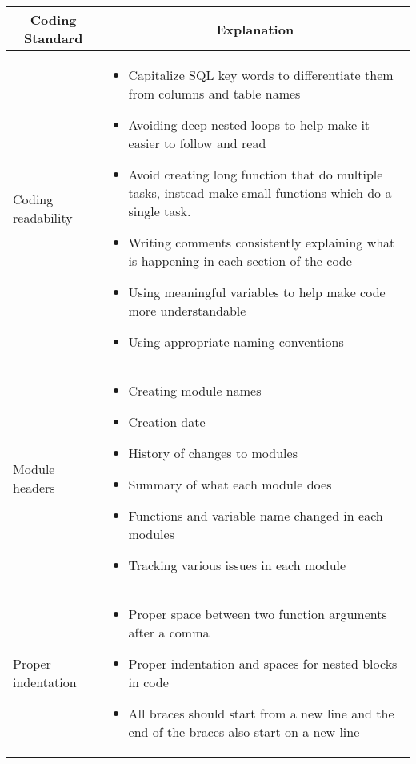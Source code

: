 \documentclass[12pt,titlepage]{article}
\begin{document}
	\begin{longtable}{|p{6cm}|p{10cm}|}
		\hline
		\multicolumn{1}{|c|}{\textbf{Coding Standard}} & \multicolumn{1}{c|}{\textbf{Explanation}} 
		\\ \hline
		Coding readability
		&  
		\begin{itemize}
			\item Capitalize SQL key words to differentiate them from columns and table names
			\item Avoiding deep nested loops to help make it easier to follow and read
			\item Avoid creating long function that do multiple tasks, instead make small functions which do a single task.
			\item Writing comments consistently explaining what is happening in each section of the code
			\item Using meaningful variables to help make code more understandable
			\item Using appropriate naming conventions
		\end{itemize}                                 
		\\ \hline
		Module headers
		&  
		\begin{itemize}
			\item Creating module names
			\item Creation date
			\item History of changes to modules
			\item Summary of what each module does
			\item Functions and variable name changed in each modules
			\item Tracking various issues in each module
		\end{itemize} 
								
		\\ \hline
		Proper indentation
		&
		\begin{itemize}
			\item Proper space between two function arguments after a comma
			\item Proper indentation and spaces for nested blocks in code
			\item All braces should start from a new line and the end of the braces also start on a new line
		\end{itemize}
									
		\\ \hline
	\end{longtable}
\end{document}
